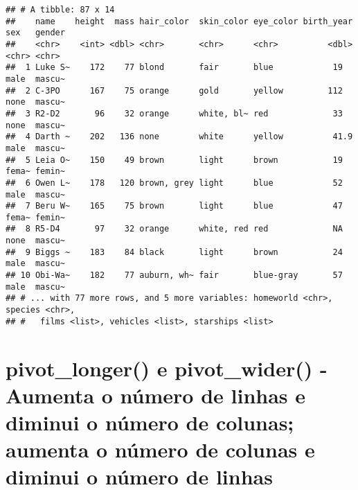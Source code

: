 \documentclass[]{book}
\newenvironment{Shaded}{\begin{snugshade}}{\end{snugshade}}
\newcommand{\DataTypeTok}[1]{\textcolor[rgb]{0.13,0.29,0.53}{#1}}
\newcommand{\DecValTok}[1]{\textcolor[rgb]{0.00,0.00,0.81}{#1}}
\newcommand{\KeywordTok}[1]{\textcolor[rgb]{0.13,0.29,0.53}{\textbf{#1}}}
\newcommand{\NormalTok}[1]{#1}
\newcommand{\OperatorTok}[1]{\textcolor[rgb]{0.81,0.36,0.00}{\textbf{#1}}}
\newcommand{\StringTok}[1]{\textcolor[rgb]{0.31,0.60,0.02}{#1}}
\begin{document}
\begin{verbatim}
## # A tibble: 87 x 14
##    name    height  mass hair_color  skin_color eye_color birth_year sex   gender
##    <chr>    <int> <dbl> <chr>       <chr>      <chr>          <dbl> <chr> <chr> 
##  1 Luke S~    172    77 blond       fair       blue            19   male  mascu~
##  2 C-3PO      167    75 orange      gold       yellow         112   none  mascu~
##  3 R2-D2       96    32 orange      white, bl~ red             33   none  mascu~
##  4 Darth ~    202   136 none        white      yellow          41.9 male  mascu~
##  5 Leia O~    150    49 brown       light      brown           19   fema~ femin~
##  6 Owen L~    178   120 brown, grey light      blue            52   male  mascu~
##  7 Beru W~    165    75 brown       light      blue            47   fema~ femin~
##  8 R5-D4       97    32 orange      white, red red             NA   none  mascu~
##  9 Biggs ~    183    84 black       light      brown           24   male  mascu~
## 10 Obi-Wa~    182    77 auburn, wh~ fair       blue-gray       57   male  mascu~
## # ... with 77 more rows, and 5 more variables: homeworld <chr>, species <chr>,
## #   films <list>, vehicles <list>, starships <list>
\end{verbatim}

\hypertarget{pivot_longer-e-pivot_wider---aumenta-o-nuxfamero-de-linhas-e-diminui-o-nuxfamero-de-colunas-aumenta-o-nuxfamero-de-colunas-e-diminui-o-nuxfamero-de-linhas}{%
\section{pivot\_longer() e pivot\_wider() - Aumenta o número de linhas e diminui o número de colunas; aumenta o número de colunas e diminui o número de linhas}\label{pivot_longer-e-pivot_wider---aumenta-o-nuxfamero-de-linhas-e-diminui-o-nuxfamero-de-colunas-aumenta-o-nuxfamero-de-colunas-e-diminui-o-nuxfamero-de-linhas}}

\begin{Shaded}
\end{Shaded}
\end{document}
